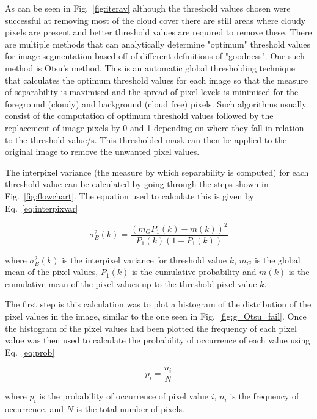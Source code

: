 As can be seen in Fig.~\ref{fig:iterav} although the threshold values chosen were successful at removing most of the cloud cover there are still areas where cloudy pixels are present and better threshold values are required to remove these. There are multiple methods that can analytically determine "optimum" threshold values for image segmentation based off of different definitions of "goodness". One such method is Otsu's method. This is an automatic global thresholding technique that calculates the optimum threshold values for each image so that the measure of separability is maximised and the spread of pixel levels is minimised for the foreground (cloudy) and background (cloud free) pixels. Such algorithms usually consist of the computation of optimum threshold values followed by the replacement of image pixels by 0 and 1 depending on where they fall in relation to the threshold value/s. This thresholded mask can then be applied to the original image to remove the unwanted pixel values.

\par
The interpixel variance (the measure by which separability is computed) for each threshold value can be calculated by going through the steps shown in Fig.~\ref{fig:flowchart}. The equation used to calculate this is given by Eq.~\ref{eq:interpixvar}

\begin{equation}\label{eq:interpixvar}
\sigma_{B}^{2}(k)=\frac{\left(m_{G} P_{1}(k)-m(k)\right)^{2}}{P_{1}(k)\left(1-P_{1}(k)\right)}
\end{equation}


where $\sigma_{B}^{2}(k)$ is the interpixel variance for threshold value $k$, $m_G$ is the global mean of the pixel values, $P_{1}(k)$ is the cumulative probability and $m(k)$ is the cumulative mean of the pixel values up to the threshold pixel value $k$.
\\
\par
The first step is this calculation was to plot a histogram of the distribution of the pixel values in the image, similar to the one seen in Fig.~\ref{fig:g_Otsu_fail}. Once the histogram of the pixel values had been plotted the frequency of each pixel value was then used to calculate the probability of occurrence of each value using Eq.~\ref{eq:prob}

\begin{equation}\label{eq:prob}
p_{i}=\frac{n_{i}}{N}
\end{equation}


where $p_{i}$ is the probability of occurrence of pixel value $i$, $n_{i}$ is the frequency of occurrence, and $N$ is the total number of pixels.

